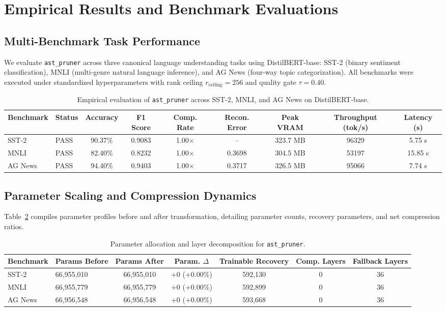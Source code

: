 \section{Empirical Results and Benchmark Evaluations}
\label{sec:results}

\subsection{Multi-Benchmark Task Performance}
We evaluate \texttt{ast\_pruner} across three canonical language understanding tasks using DistilBERT-base: SST-2 (binary sentiment classification), MNLI (multi-genre natural language inference), and AG News (four-way topic categorization). All benchmarks were executed under standardized hyperparameters with rank ceiling $r_{\mathrm{ceiling}} = 256$ and quality gate $\tau = 0.40$.

\begin{table}[t]
\centering
\small
\begin{tabular}{llccccccc}
\toprule
\textbf{Benchmark} & \textbf{Status} & \textbf{Accuracy} & \textbf{F1 Score} & \textbf{Comp. Rate} & \textbf{Recon. Error} & \textbf{Peak VRAM} & \textbf{Throughput (tok/s)} & \textbf{Latency (s)} \\
\midrule
SST-2 & PASS & 90.37\% & 0.9083 & 1.00$\times$ & -- & 323.7 MB & 96329 & 5.75 s \\
MNLI & PASS & 82.40\% & 0.8232 & 1.00$\times$ & 0.3698 & 304.5 MB & 53197 & 15.85 s \\
AG News & PASS & 94.40\% & 0.9403 & 1.00$\times$ & 0.3717 & 326.5 MB & 95066 & 7.74 s \\
\bottomrule
\end{tabular}
\caption{Empirical evaluation of \texttt{ast\_pruner} across SST-2, MNLI, and AG News on DistilBERT-base.}
\label{tab:results_ast_pruner}
\end{table}

\subsection{Parameter Scaling and Compression Dynamics}
Table~\ref{tab:params_ast_pruner} compiles parameter profiles before and after transformation, detailing parameter counts, recovery parameters, and net compression ratios.

\begin{table}[t]
\centering
\small
\begin{tabular}{llccccc}
\toprule
\textbf{Benchmark} & \textbf{Params Before} & \textbf{Params After} & \textbf{Param. $\Delta$} & \textbf{Trainable Recovery} & \textbf{Comp. Layers} & \textbf{Fallback Layers} \\
\midrule
SST-2 & 66,955,010 & 66,955,010 & +0 (+0.00\%) & 592,130 & 0 & 36 \\
MNLI & 66,955,779 & 66,955,779 & +0 (+0.00\%) & 592,899 & 0 & 36 \\
AG News & 66,956,548 & 66,956,548 & +0 (+0.00\%) & 593,668 & 0 & 36 \\
\bottomrule
\end{tabular}
\caption{Parameter allocation and layer decomposition for \texttt{ast\_pruner}.}
\label{tab:params_ast_pruner}
\end{table}


